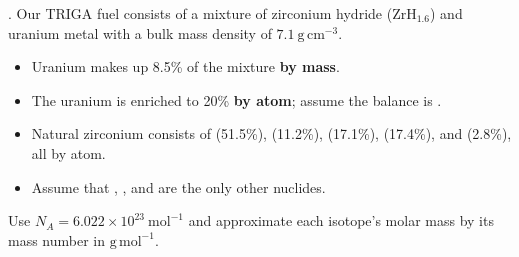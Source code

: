 .  Our TRIGA fuel consists of a mixture of zirconium
hydride ($\mathrm{ZrH}_{1.6}$) and uranium metal with a bulk mass density of
$7.1~\mathrm{g\,cm^{-3}}$.
\begin{itemize}
\item Uranium makes up 8.5\% of the mixture \textbf{by mass}.
\item The uranium is enriched to 20\%  \textbf{by atom}; assume
the balance is .
\item Natural zirconium consists of  (51.5\%), 
(11.2\%),  (17.1\%),  (17.4\%), and 
(2.8\%), all by atom.
\item Assume that , , and  are the only
other nuclides.
\end{itemize}
Use $N_A=6.022\times10^{23}~\mathrm{mol^{-1}}$ and approximate each isotope's
molar mass by its mass number in $\mathrm{g\,mol^{-1}}$.

